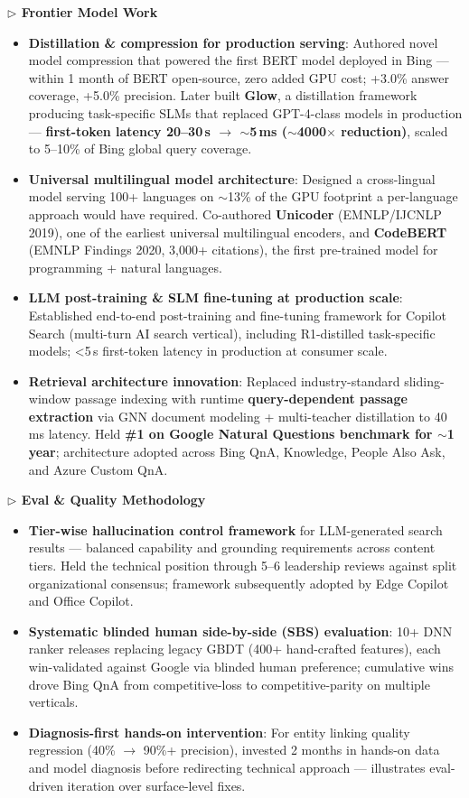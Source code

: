 \documentclass[10.5pt,letterpaper]{article}
\newcommand{\subhead}[1]{\smallskip\noindent\textcolor{blue!60!black}{\textbf{$\triangleright$ #1}}\par\vspace{1pt}}
\begin{document}
\subhead{Frontier Model Work}
\begin{itemize}
  \item \textbf{Distillation \& compression for production serving}: Authored novel model compression that powered the first BERT model deployed in Bing --- within 1 month of BERT open-source, zero added GPU cost; +3.0\% answer coverage, +5.0\% precision. Later built \textbf{Glow}, a distillation framework producing task-specific SLMs that replaced GPT-4-class models in production --- \textbf{first-token latency 20--30\,s $\to$ $\sim$5\,ms ($\sim$4000$\times$ reduction)}, scaled to 5--10\% of Bing global query coverage.
  \item \textbf{Universal multilingual model architecture}: Designed a cross-lingual model serving 100+ languages on $\sim$13\% of the GPU footprint a per-language approach would have required. Co-authored \textbf{Unicoder} (EMNLP/IJCNLP 2019), one of the earliest universal multilingual encoders, and \textbf{CodeBERT} (EMNLP Findings 2020, 3,000+ citations), the first pre-trained model for programming + natural languages.
  \item \textbf{LLM post-training \& SLM fine-tuning at production scale}: Established end-to-end post-training and fine-tuning framework for Copilot Search (multi-turn AI search vertical), including R1-distilled task-specific models; <5\,s first-token latency in production at consumer scale.
  \item \textbf{Retrieval architecture innovation}: Replaced industry-standard sliding-window passage indexing with runtime \textbf{query-dependent passage extraction} via GNN document modeling + multi-teacher distillation to 40\,ms latency. Held \textbf{\#1 on Google Natural Questions benchmark for $\sim$1 year}; architecture adopted across Bing QnA, Knowledge, People Also Ask, and Azure Custom QnA.
\end{itemize}

\subhead{Eval \& Quality Methodology}
\begin{itemize}
  \item \textbf{Tier-wise hallucination control framework} for LLM-generated search results --- balanced capability and grounding requirements across content tiers. Held the technical position through 5--6 leadership reviews against split organizational consensus; framework subsequently adopted by Edge Copilot and Office Copilot.
  \item \textbf{Systematic blinded human side-by-side (SBS) evaluation}: 10+ DNN ranker releases replacing legacy GBDT (400+ hand-crafted features), each win-validated against Google via blinded human preference; cumulative wins drove Bing QnA from competitive-loss to competitive-parity on multiple verticals.
  \item \textbf{Diagnosis-first hands-on intervention}: For entity linking quality regression (40\% $\to$ 90\%+ precision), invested 2 months in hands-on data and model diagnosis before redirecting technical approach --- illustrates eval-driven iteration over surface-level fixes.
\end{itemize}
\end{document}

